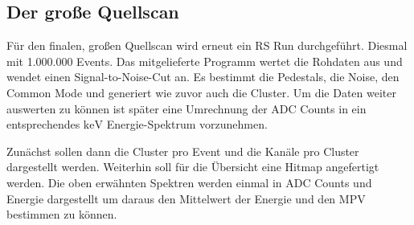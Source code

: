 \subsection{Der große Quellscan}

Für den finalen, großen Quellscan wird erneut ein RS Run durchgeführt.
Diesmal mit 1.000.000 Events.
Das mitgelieferte Programm wertet die Rohdaten aus und wendet einen Signal-to-Noise-Cut an.
Es bestimmt die Pedestals, die Noise, den Common Mode und generiert wie zuvor auch die Cluster.
Um die Daten weiter auswerten zu können ist später eine Umrechnung der ADC Counts in ein entsprechendes $\si{\kilo\electronvolt}$ Energie-Spektrum vorzunehmen.

Zunächst sollen dann die Cluster pro Event und die Kanäle pro Cluster dargestellt werden.
Weiterhin soll für die Übersicht eine Hitmap angefertigt werden.
Die oben erwähnten Spektren werden einmal in ADC Counts und Energie dargestellt um daraus den Mittelwert der Energie und den MPV bestimmen zu können.

\newpage
